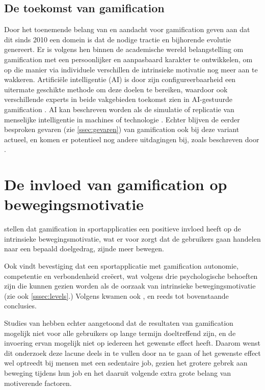 \subsection{De toekomst van gamification}

Door het toenemende belang van en aandacht voor gamification geven \autocite{Bezzina2023} aan dat dit sinds 2010 een domein is dat de nodige tractie en bijhorende evolutie genereert. Er is volgens hen binnen de academische wereld belangstelling om gamification met een persoonlijker en aanpasbaard karakter te ontwikkelen, om op die manier via individuele verschillen de intrinsieke motivatie nog meer aan te wakkeren. Artificiële intelligentie (AI) is door zijn configureerbaarheid een uitermate geschikte methode om deze doelen te bereiken, waardoor ook verschillende experts in beide vakgebieden toekomst zien in AI-gestuurde gamification \autocite{Bezzina2023}. AI kan beschreven worden als de simulatie of replicatie van menselijke intelligentie in machines of technologie \autocite{Stewart2020}. Echter blijven de eerder besproken gevaren (zie \ref{ssec:gevaren}) van gamification ook bij deze variant actueel, en komen er potentieel nog andere uitdagingen bij, zoals beschreven door \textcite{Saghiri2022}.

\section{De invloed van gamification op bewegingsmotivatie}

\textcite{Kari2016} stellen dat gamification in sportapplicaties een positieve invloed heeft op de intrinsieke bewegingsmotivatie, wat er voor zorgt dat de gebruikers gaan handelen naar een bepaald doelgedrag, zijnde meer bewegen.

Ook \textcite{Bitrian2020} vindt bevestiging dat een sportapplicatie met gamification autonomie, competentie en verbondenheid creëert, wat volgens \textcite{ManzanoLeon2021} drie psychologische behoeften zijn die kunnen gezien worden als de oorzaak van intrinsieke bewegingsmotivatie (zie ook \ref{sssec:levels}.) Volgens \textcite{Tu2019} kwamen ook \textcite{Lewis2016}, \textcite{Liu2017} en \textcite{Tabak2015} reeds tot bovenstaande conclusies.

Studies van \textcite{Hamari2013a} hebben echter aangetoond dat de resultaten van gamification mogelijk niet voor alle gebruikers op lange termijn doeltreffend zijn, en de invoering ervan mogelijk niet op iedereen het gewenste effect heeft. Daarom wenst dit onderzoek deze lacune deels in te vullen door na te gaan of het gewenste effect wel optreedt bij mensen met een sedentaire job, gezien het grotere gebrek aan beweging tijdens hun job en het daaruit volgende extra grote belang van motiverende factoren.

